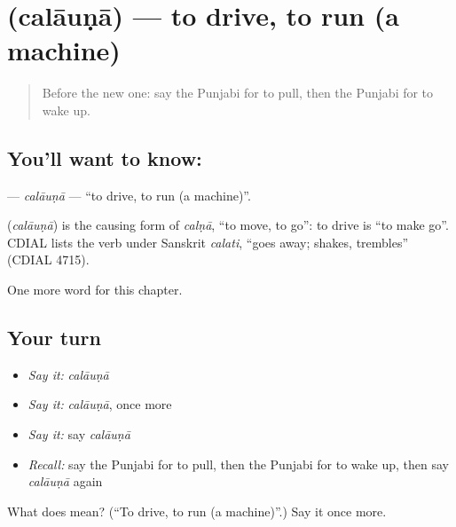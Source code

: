 \section[\texorpdfstring{\pa{ਚਲਾਉਣਾ} (calāuṇā)}{ਚਲਾਉਣਾ (calāuṇā)}]{ (calāuṇā) — to drive, to run (a machine)}

\label{lesson:PA-C150-calauna}



\begin{quote}
Before the new one: say the Punjabi for to pull, then the Punjabi for to wake up.
\end{quote}

\subsection*{You'll want to know: }
\textbf{} — \emph{calāuṇā} — \textquotedblleft{}to drive, to run (a machine)\textquotedblright{}.

\begin{cousinweb}
\textbf{} (\emph{calāuṇā}) is the causing form of \emph{calṇā}, \textquotedblleft{}to move, to go\textquotedblright{}: to drive is \textquotedblleft{}to make go\textquotedblright{}. CDIAL lists the verb under Sanskrit \emph{calati}, \textquotedblleft{}goes away; shakes, trembles\textquotedblright{} (CDIAL 4715).
\end{cousinweb}

\begin{grammarlens}[title={What you've built}]
One more word for this chapter.
\end{grammarlens}

\subsection*{Your turn}
\begin{itemize}
\raggedright
  \item \emph{Say it:} \emph{calāuṇā}
  \item \emph{Say it:} \emph{calāuṇā}, once more
  \item \emph{Say it:} say \emph{calāuṇā}
  \item \emph{Recall:} say the Punjabi for to pull, then the Punjabi for to wake up, then say \emph{calāuṇā} again
\end{itemize}

\begin{tcolorbox}[breakable,colback=teal!4,colframe=teal!35!black,title={Before you move on}]
What does  mean? (\textquotedblleft{}To drive, to run (a machine)\textquotedblright{}.) Say it once more.
\end{tcolorbox}
